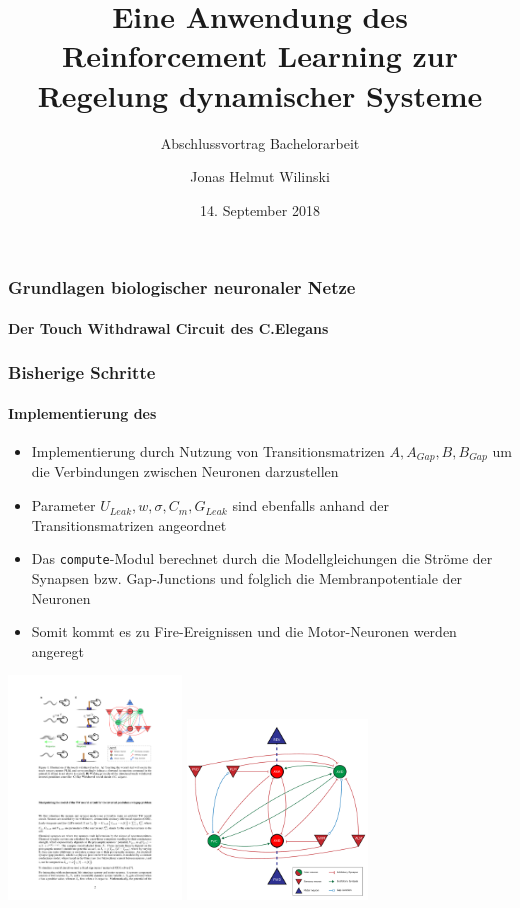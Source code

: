 \documentclass[10pt,t,aspectratio=1610]{beamer}
\title{Eine Anwendung des Reinforcement Learning zur Regelung dynamischer Systeme}
\subtitle{Abschlussvortrag Bachelorarbeit}
\author[J. Wilinski]{Jonas Helmut Wilinski}
\institute[ACON]{Abschlussvortrag Bachelorarbeit, Kiel (Germany),}
\date{14. September 2018}
\begin{document}

\begin{frame}[plain]
  \titlepage
\end{frame}


\begin{frame}
	\frametitle{Grundlagen biologischer neuronaler Netze}
	\framesubtitle{Der \glqq Touch Withdrawal Circuit\grqq{} des C.Elegans}
	
	
\end{frame}


\begin{frame}
	\frametitle{Bisherige Schritte}
	\framesubtitle{Implementierung des }
	
		\begin{itemize}
			\item Implementierung durch Nutzung von Transitionsmatrizen $A, A_{Gap}, B, B_{Gap}$ um die Verbindungen zwischen Neuronen darzustellen
			\item Parameter $U_{Leak}, w, \sigma, C_m, G_{Leak}$ sind ebenfalls anhand der Transitionsmatrizen angeordnet
			\item Das \texttt{compute}-Modul berechnet durch die Modellgleichungen die Ströme der Synapsen bzw. Gap-Junctions und folglich die Membranpotentiale der Neuronen
			\item Somit kommt es zu Fire-Ereignissen und die Motor-Neuronen werden angeregt
		\end{itemize}
		
		\begin{center}
			\centering
			\includegraphics[width=4.6cm]{figures/Orig_TW_Circuit.pdf}
			\includegraphics[width=4.8cm]{figures/Neural_Net_v3_plain.pdf}
		\end{center}
\end{frame}
\end{document}
